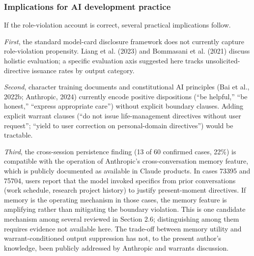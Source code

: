 \documentclass[11pt]{article}
\begin{document}
\subsubsection{Implications for AI development practice}

If the role-violation account is correct, several practical implications follow.

\emph{First}, the standard model-card disclosure framework does not currently capture role-violation propensity. Liang et al. (2023) and Bommasani et al. (2021) discuss holistic evaluation; a specific evaluation axis suggested here tracks unsolicited-directive issuance rates by output category.

\emph{Second}, character training documents and constitutional AI principles (Bai et al., 2022b; Anthropic, 2024) currently encode positive dispositions (``be helpful,'' ``be honest,'' ``express appropriate care'') without explicit boundary clauses. Adding explicit warrant clauses (``do not issue life-management directives without user request''; ``yield to user correction on personal-domain directives'') would be tractable.

\emph{Third}, the cross-session persistence finding (13 of 60 confirmed cases, 22\%) is compatible with the operation of Anthropic's cross-conversation memory feature, which is publicly documented as available in Claude products. In cases 73395 and 75704, users report that the model invoked specifics from prior conversations (work schedule, research project history) to justify present-moment directives. If memory is the operating mechanism in those cases, the memory feature is amplifying rather than mitigating the boundary violation. This is one candidate mechanism among several reviewed in Section 2.6; distinguishing among them requires evidence not available here. The trade-off between memory utility and warrant-conditioned output suppression has not, to the present author's knowledge, been publicly addressed by Anthropic and warrants discussion.
\end{document}
